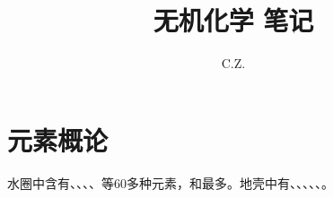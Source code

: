 \documentclass[utf8]{ctexart}
\title{无机化学 笔记}
\author{C.Z.}
\begin{document}
  \maketitle
  \section{元素概论}
  水圈中含有、、、、等60多种元素，和最多。地壳中有、、、、、。
\end{document}
